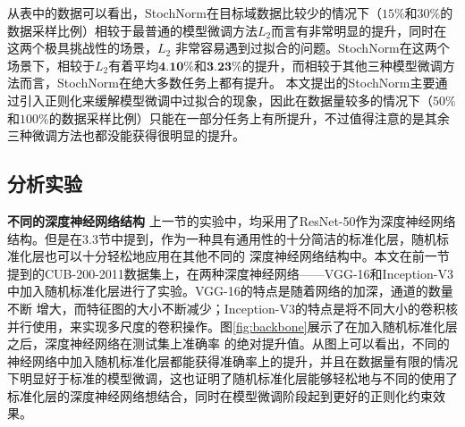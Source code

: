 从表中的数据可以看出，StochNorm在目标域数据比较少的情况下（$15\%$和$30\%$的数据采样比例）相较于最普通的模型微调方法$L_2$而言有非常明显的提升，同时在这两个极具挑战性的场景，$L_2$
非常容易遇到过拟合的问题。StochNorm在这两个场景下，相较于$L_2$有着平均$\textbf{4.10\%}$和$\textbf{3.23\%}$的提升，而相较于其他三种模型微调方法而言，StochNorm在绝大多数任务上都有提升。
本文提出的StochNorm主要通过引入正则化来缓解模型微调中过拟合的现象，因此在数据量较多的情况下（$50\%$和$100\%$的数据采样比例）只能在一部分任务上有所提升，不过值得注意的是其余三种微调方法也都没能获得很明显的提升。

\subsection{分析实验}
\label{section:ablation}

\textbf{不同的深度神经网络结构 } 上一节的实验中，均采用了ResNet-50作为深度神经网络结构。但是在3.3节中提到，作为一种具有通用性的十分简洁的标准化层，随机标准化层也可以十分轻松地应用在其他不同的
深度神经网络结构中。本文在前一节提到的CUB-200-2011数据集上，在两种深度神经网络——VGG-16\citep{simonyan2015very}和Inception-V3\citep{szegedy2016rethinking}中加入随机标准化层进行了实验。VGG-16的特点是随着网络的加深，通道的数量不断
增大，而特征图的大小不断减少；Inception-V3的特点是将不同大小的卷积核并行使用，来实现多尺度的卷积操作。图\ref{fig:backbone}展示了在加入随机标准化层之后，深度神经网络在测试集上准确率
的绝对提升值。从图上可以看出，不同的神经网络中加入随机标准化层都能获得准确率上的提升，并且在数据量有限的情况下明显好于标准的模型微调，这也证明了随机标准化层能够轻松地与不同的使用了
标准化层的深度神经网络想结合，同时在模型微调阶段起到更好的正则化约束效果。

